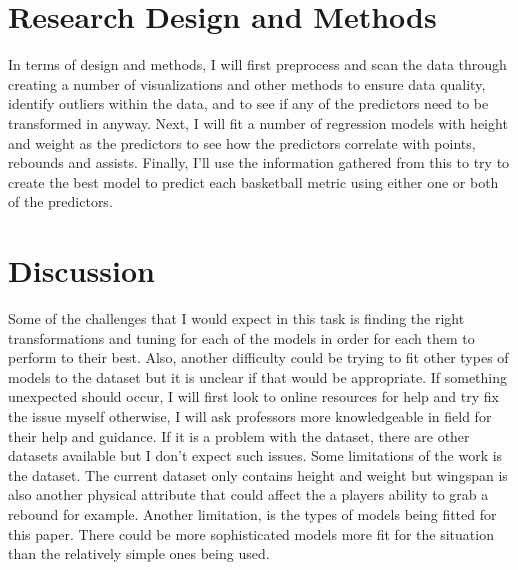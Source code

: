 \documentclass[12pt]{article}
\begin{document}
\section{Research Design and Methods}

In terms of design and methods, I will first preprocess and scan the data through creating a number of
visualizations and other methods to ensure data quality, identify outliers within the data, and to see if any of the
predictors need to be transformed in anyway. Next, I will fit a number of regression models with height and 
weight as the predictors to see how the predictors correlate with points, rebounds and assists. Finally, I'll 
use the information gathered from this to try to create the best model to predict each basketball metric using 
either one or both of the predictors.

\section{Discussion}

Some of the challenges that I would expect in this task is finding the right transformations and tuning
for each of the models in order for each them to perform to their best. Also, another difficulty could be trying to
fit other types of models to the dataset but it is unclear if that would be appropriate. If something unexpected
should occur, I will first look to online resources for help and try fix the issue myself otherwise, I will ask professors
more knowledgeable in field for their help and guidance. If it is a problem with the dataset, there are other datasets
available but I don't expect such issues. Some limitations of the work is the dataset. The current dataset only 
contains height and weight but wingspan is also another physical attribute that could affect the a players ability to 
grab a rebound for example. Another limitation, is the types of models being fitted for this paper. There could be 
more sophisticated models more fit for the situation than the relatively simple ones being used.



\end{document}
